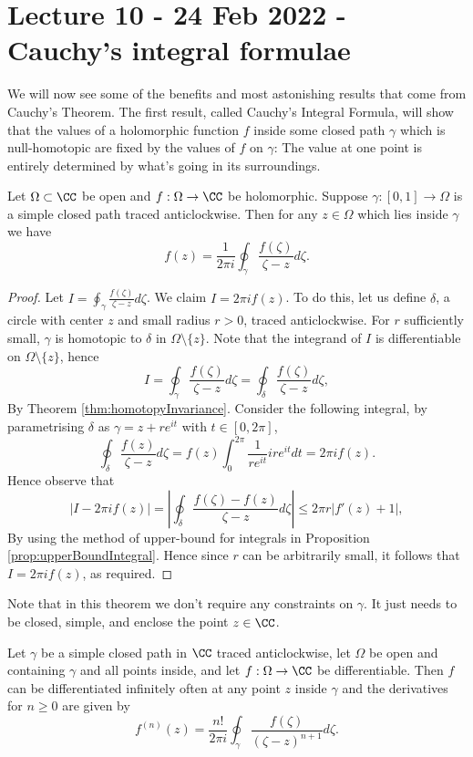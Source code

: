 \section{Lecture 10 - 24 Feb 2022 - Cauchy's integral formulae}
We will now see some of the benefits and most astonishing results that come from
Cauchy's Theorem. The first result, called Cauchy's Integral Formula, will show
that the values of a holomorphic function $f$ inside some closed path $\gamma$
which is null-homotopic are fixed by the values of $f$ on $\gamma$: The value at
one point is entirely determined by what's going in its surroundings.
\begin{theorem}
  Let $\Omega\subset\CC$ be open and $f:\Omega\to\CC$ be holomorphic. Suppose
  $\gamma:[0,1]\to\Omega$ is a simple closed path traced anticlockwise. Then for
  any $z\in\Omega$ which lies inside $\gamma$ we have
  \[f(z)=\frac{1}{2\pi i} \oint_{\gamma} \frac{f(\zeta)}{\zeta-z} d\zeta.\]
  \label{thm:CauchyIntegral}
\end{theorem}
\begin{proof}
  Let $I=\oint_{\gamma}\frac{f(\zeta)}{\zeta-z}d\zeta$. We claim $I=2\pi i
  f(z)$. To do this, let us define $\delta$, a circle with center $z$ and small
  radius $r>0$, traced anticlockwise. For $r$ sufficiently small, $\gamma$ is
  homotopic to $\delta$ in $\Omega\setminus\{z\}$. Note that the integrand of
  $I$ is differentiable on $\Omega\setminus\{z\}$, hence 
  \[I=\oint_{\gamma}\frac{f(\zeta)}{\zeta-z}d\zeta=\oint_{\delta}\frac{f(\zeta)}{\zeta-z}d\zeta,\]
  By Theorem \ref{thm:homotopyInvariance}. Consider the following integral, by
  parametrising $\delta$ as $\gamma=z+re^{it}$ with $t\in[0,2\pi]$,
  \[\oint_{\delta}\frac{f(z)}{\zeta - z} d\zeta =
  f(z)\int_0^{2\pi}\frac{1}{re^{it}}ire^{it}dt=2\pi i f(z).\]
  Hence observe that 
  \[|I-2\pi i f(z)| = |\oint_{\delta}\frac{f(\zeta)-f(z)}{\zeta-z} d\zeta| \leq
  2\pi r |f'(z)+1|, \]
  By using the method of upper-bound for integrals in Proposition
  \ref{prop:upperBoundIntegral}. Hence since $r$ can be arbitrarily small, it
  follows that $I=2\pi i f(z)$, as required.
\end{proof}
\begin{remark}
  Note that in this theorem we don't require any constraints on $\gamma$. It
  just needs to be closed, simple, and enclose the point $z\in\CC$.
\end{remark}
\begin{theorem}
  Let $\gamma$ be a simple closed path in $\CC$ traced anticlockwise, let
  $\Omega$ be open and containing $\gamma$ and all points inside, and let
  $f:\Omega\to\CC$ be differentiable. Then $f$ can be differentiated infinitely
  often at any point $z$ inside $\gamma$ and the derivatives for $n\geq 0$ are
  given by
  \[f^{(n)}(z) = \frac{n!}{2\pi i} \oint_{\gamma}
  \frac{f(\zeta)}{(\zeta-z)^{n+1}}d\zeta.\]
  \label{<+label+>}
\end{theorem}

